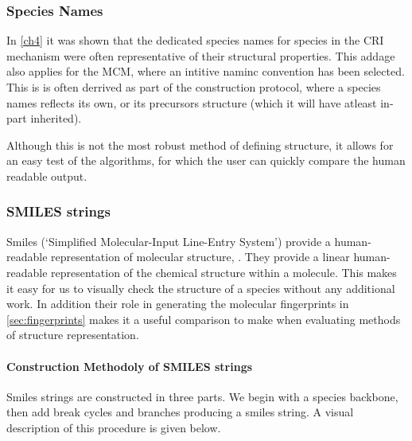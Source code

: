 \subsubsection{Species Names}
In \autoref{ch4} it was shown that the dedicated species names for species in the CRI mechanism were often representative of their structural properties. This addage also applies for the MCM, where an intitive naminc convention has been selected. This is is often derrived as part of the construction protocol, where a species names reflects its own, or its precursors structure (which it will have atleast in-part inherited).

Although this is not the most robust method of defining structure, it allows for an easy test of the algorithms, for which the user can quickly compare the human readable output. 




\subsubsection{SMILES strings}\label{sec:smiles}


 Smiles (`Simplified Molecular-Input Line-Entry System') provide a human-readable representation of molecular structure,
 \citep{smiles}. They provide a linear human-readable representation of the chemical structure within a molecule. This makes it easy for us to visually check the structure of a species without any additional work. In addition their role in generating the molecular fingerprints in \autoref{sec:fingerprints} makes it a useful comparison to make when evaluating methods of structure representation. 

\paragraph*{Construction Methodoly of SMILES strings}
Smiles strings are constructed in three parts. We begin with a species backbone, then add break cycles and branches producing a smiles string. A visual description of this procedure is given below. 

